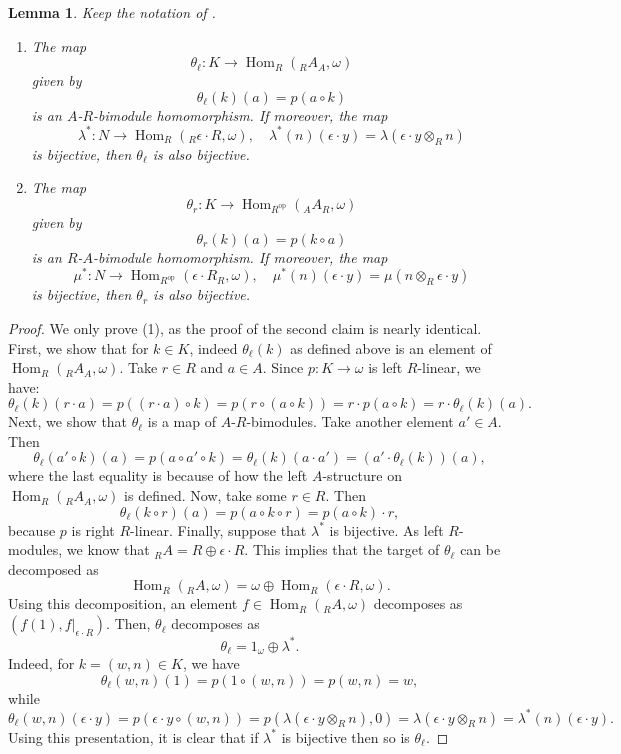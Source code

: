 \documentclass{amsart}
\newtheorem{lem}[equation]{Lemma}
\theoremstyle{definition}
\newcommand{\opn}{\operatorname}
\numberwithin{equation}{section}
\begin{document}
\begin{lem}\label{lem:twoduals}
Keep the notation of .
\begin{enumerate}
\item
The map 
\[
\theta_{\ell} : K\to \opn{Hom}_R({}_R A_A, \omega) 
\]
given by
\[
\theta_{\ell}(k) (a) = p(a\circ k)
\]
is an $A$-$R$-bimodule homomorphism.
If moreover, the map 
\[
\lambda^* : N \to \opn{Hom}_R({}_R \epsilon \cdot R,\omega), \quad \lambda^*(n) (\epsilon \cdot y)  = \lambda(\epsilon\cdot y \otimes_R n)
\]
is bijective, then $\theta_{\ell}$ is also bijective.
\item
The map 
\[
\theta_{r} : K\to \opn{Hom}_{R^{\opn{op}}}({}_A A_R, \omega) 
\]
given by
\[
\theta_{r}(k) (a) = p(k\circ a)
\]
is an $R$-$A$-bimodule homomorphism.
If moreover, the map
\[
\mu^* :N \to \opn{Hom}_{R^{\opn{op}}}(\epsilon \cdot R_R,\omega), \quad \mu^*(n) (\epsilon \cdot y) = \mu(n\otimes_R \epsilon \cdot y)
\]
is bijective, then $\theta_r$ is also bijective.
\end{enumerate}
\end{lem}
\begin{proof}
We only prove (1), as the proof of the second claim is nearly identical.
First, we show that for $k \in K$, indeed $\theta_{\ell}(k)$ as defined above is an element of $\opn{Hom}_R({}_R A_A, \omega)$.
Take $r \in R$ and $a\in A$.
Since $p:K \to \omega$ is left $R$-linear, we have:
\[
\theta_{\ell}(k) (r\cdot a) = p((r\cdot a) \circ k) = p(r \circ (a \circ k)) = r\cdot p(a\circ k) = r\cdot \theta_{\ell}(k)(a).
\]
Next, we show that $\theta_{\ell}$ is a map of $A$-$R$-bimodules.
Take another element $a' \in A$.
Then 
\[
\theta_{\ell}(a' \circ k)(a) = p(a\circ a' \circ k) = \theta_{\ell}(k)(a\cdot a') = (a'\cdot \theta_{\ell}(k))(a),
\]
where the last equality is because of how the left $A$-structure on 
$\opn{Hom}_R({}_R A_A, \omega)$ is defined.
Now, take some $r \in R$.
Then
\[
\theta_{\ell}(k \circ r)(a) = p(a\circ k \circ r) = p(a\circ k)\cdot r,
\]
because $p$ is right $R$-linear.
Finally, suppose that $\lambda^*$ is bijective.
As left $R$-modules, we know that ${}_R A = R \oplus \epsilon \cdot R$.
This implies that the target of $\theta_{\ell}$ can be decomposed as
\[
\opn{Hom}_R({}_R A, \omega) = \omega \oplus \opn{Hom}_R(\epsilon\cdot R,\omega).
\]
Using this decomposition, 
an element $f \in \opn{Hom}_R({}_R A, \omega)$ decomposes as $(f(1),f|_{\epsilon \cdot R})$.
Then,
$\theta_{\ell}$ decomposes as
\[
\theta_{\ell} = 1_{\omega} \oplus \lambda^*.
\]
Indeed, for $k = (w,n) \in K$, we have
\[
\theta_{\ell}(w,n)(1) = p(1\circ (w,n)) = p(w,n) =w,
\]
while
\[
\theta_{\ell}(w,n)(\epsilon \cdot y) = p(\epsilon \cdot y \circ (w,n)) = 
p(\lambda(\epsilon \cdot y \otimes_R n),0) =\lambda(\epsilon \cdot y \otimes_R n) = \lambda^*(n)(\epsilon \cdot y).
\]
Using this presentation, it is clear that if $\lambda^*$ is bijective then so is $\theta_{\ell}$.
\end{proof}
\end{document}
